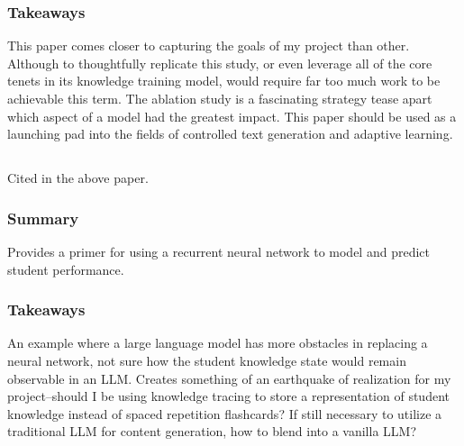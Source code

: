 \documentclass[
	letterpaper, %
]{jdf}
\begin{document}
\subsubsection{Takeaways}
This paper comes closer to capturing the goals of my project than other. Although to thoughtfully replicate this study, or even leverage all of the core tenets in its knowledge training model, would require far too much work to be achievable this term. The ablation study is a fascinating strategy tease apart which aspect of a model had the greatest impact. This paper should be used as a launching pad into the fields of controlled text generation and adaptive learning. 

\subsection{}
Cited in the above paper.

\subsubsection{Summary}
Provides a primer for using a recurrent neural network to model and predict student performance.

\subsubsection{Takeaways}
An example where a large language model has more obstacles in replacing a neural network, not sure how the student knowledge state would remain observable in an LLM. Creates something of an earthquake of realization for my project–should I be using knowledge tracing to store a representation of student knowledge instead of spaced repetition flashcards? If still necessary to utilize a traditional LLM for content generation, how to blend into a vanilla LLM?

\subsection{}
\end{document}

